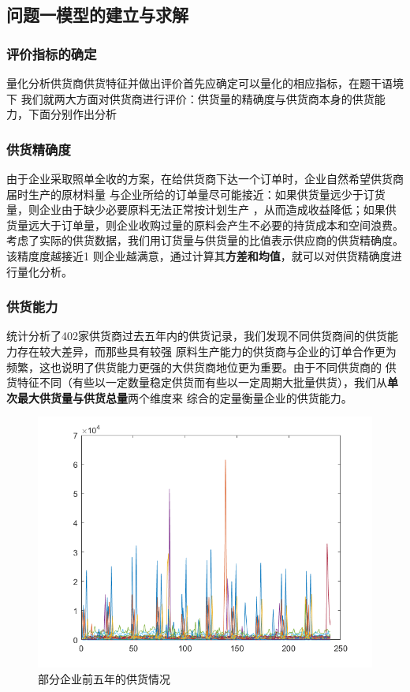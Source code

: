 \documentclass{cumcmthesis}
\begin{document}
\subsection{问题一模型的建立与求解}

\subsubsection{评价指标的确定}
量化分析供货商供货特征并做出评价首先应确定可以量化的相应指标，在题干语境下
我们就两大方面对供货商进行评价：供货量的精确度与供货商本身的供货能力，下面分别作出分析
\subsubsection*{供货精确度}
由于企业采取照单全收的方案，在给供货商下达一个订单时，企业自然希望供货商届时生产的原材料量
与企业所给的订单量尽可能接近：如果供货量远少于订货量，则企业由于缺少必要原料无法正常按计划生产
，从而造成收益降低；如果供货量远大于订单量，则企业收购过量的原料会产生不必要的持货成本和空间浪费。考虑了实际的供货数据，我们用订货量与供货量的比值表示供应商的供货精确度。该精度度越接近1
则企业越满意，通过计算其\textbf{方差和均值}，就可以对供货精确度进行量化分析。

\subsubsection*{供货能力}
统计分析了402家供货商过去五年内的供货记录，我们发现不同供货商间的供货能力存在较大差异，而那些具有较强
原料生产能力的供货商与企业的订单合作更为频繁，这也说明了供货能力更强的大供货商地位更为重要。由于不同供货商的
供货特征不同（有些以一定数量稳定供货而有些以一定周期大批量供货），我们从\textbf{单次最大供货量与供货总量}两个维度来
综合的定量衡量企业的供货能力。\par
\begin{figure}[htbp]
    \centering
    \includegraphics[scale=0.6]{offer.png}
    \caption{部分企业前五年的供货情况}     \label{fig:1}
\end{figure}
\end{document}
